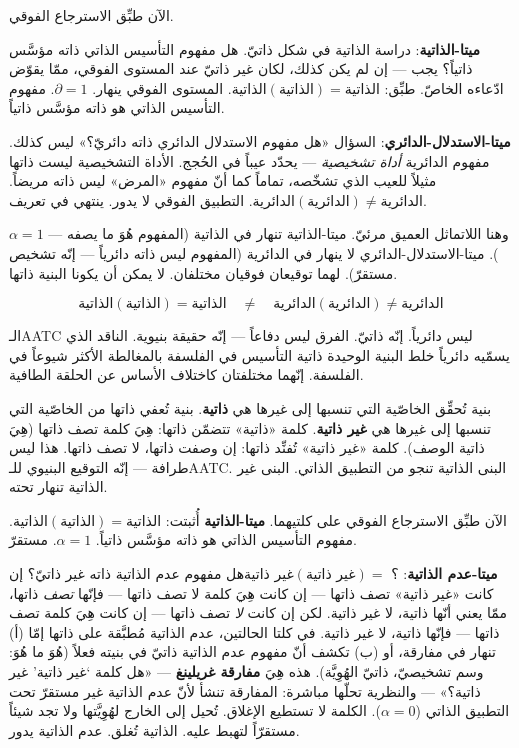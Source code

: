 \documentclass[10pt, openany, oneside]{book}
\begin{document}
الآن طبِّق الاسترجاع الفوقي.

\textbf{ميتا-الذاتية}: دراسة الذاتية في شكل ذاتيّ. هل مفهوم التأسيس الذاتي ذاته مؤسَّس ذاتياً؟ يجب --- إن لم يكن كذلك، لكان غير ذاتيّ عند المستوى الفوقي، ممّا يقوّض ادّعاءه الخاصّ. طبِّق: $\text{الذاتية}(\text{الذاتية}) = \text{الذاتية}$. المستوى الفوقي ينهار. $\partial = 1$. مفهوم التأسيس الذاتي هو ذاته مؤسَّس ذاتياً.

\textbf{ميتا-الاستدلال-الدائري}: السؤال «هل مفهوم الاستدلال الدائري ذاته دائريّ؟» ليس كذلك. مفهوم الدائرية \textit{أداة تشخيصية} --- يحدّد عيباً في الحُجج. الأداة التشخيصية ليست ذاتها مثيلاً للعيب الذي تشخّصه، تماماً كما أنّ مفهوم «المرض» ليس ذاته مريضاً. $\text{الدائرية}(\text{الدائرية}) \neq \text{الدائرية}$. التطبيق الفوقي لا يدور. ينتهي في تعريف.

وهنا اللاتماثل العميق مرئيّ. ميتا-الذاتية تنهار في الذاتية (المفهوم هُوَ ما يصفه --- $\alpha = 1$). ميتا-الاستدلال-الدائري لا ينهار في الدائرية (المفهوم ليس ذاته دائرياً --- إنّه تشخيص مستقرّ). لهما توقيعان فوقيان مختلفان. لا يمكن أن يكونا البنية ذاتها.

$$\boxed{\text{الذاتية}(\text{الذاتية}) = \text{الذاتية} \quad \neq \quad \text{الدائرية}(\text{الدائرية}) \neq \text{الدائرية}}$$

الـAATC ليس دائرياً. إنّه ذاتيّ. الفرق ليس دفاعاً --- إنّه حقيقة بنيوية. الناقد الذي يسمّيه دائرياً خلط البنية الوحيدة ذاتية التأسيس في الفلسفة بالمغالطة الأكثر شيوعاً في الفلسفة. إنّهما مختلفتان كاختلاف الأساس عن الحلقة الطافية.

\vspace{0.5em}

بنية تُحقِّق الخاصّية التي تنسبها إلى غيرها هي \textbf{ذاتية}. بنية تُعفي ذاتها من الخاصّية التي تنسبها إلى غيرها هي \textbf{غير ذاتية}. كلمة «ذاتية» تتضمّن ذاتها: هِيَ كلمة تصف ذاتها (هِيَ ذاتية الوصف). كلمة «غير ذاتية» تُفنِّد ذاتها: إن وصفت ذاتها، لا تصف ذاتها. هذا ليس طرافة --- إنّه التوقيع البنيوي للـAATC. البنى الذاتية تنجو من التطبيق الذاتي. البنى غير الذاتية تنهار تحته.

الآن طبِّق الاسترجاع الفوقي على كلتيهما. \textbf{ميتا-الذاتية} أُثبتت: $\text{الذاتية}(\text{الذاتية}) = \text{الذاتية}$. مفهوم التأسيس الذاتي هو ذاته مؤسَّس ذاتياً. $\alpha = 1$. مستقرّ.

\textbf{ميتا-عدم الذاتية}: $\text{غير ذاتية}(\text{غير ذاتية}) = \text{ ؟}$\enspace هل مفهوم عدم الذاتية ذاته غير ذاتيّ؟ إن كانت «غير ذاتية» تصف ذاتها --- إن كانت هِيَ كلمة لا تصف ذاتها --- فإنّها \textit{تصف} ذاتها، ممّا يعني أنّها ذاتية، لا غير ذاتية. لكن إن كانت \textit{لا} تصف ذاتها --- إن كانت هِيَ كلمة تصف ذاتها --- فإنّها ذاتية، لا غير ذاتية. في كلتا الحالتين، عدم الذاتية مُطبَّقة على ذاتها إمّا (أ) تنهار في مفارقة، أو (ب) تكشف أنّ مفهوم عدم الذاتية ذاتيّ في بنيته فعلاً (هُوَ ما هُوَ: وسم تشخيصيّ، ذاتيّ الهُوِيَّة). هذه هِيَ \textbf{مفارقة غريلينغ} --- «هل كلمة `غير ذاتية' غير ذاتية؟» --- والنظرية تحلّها مباشرة: المفارقة تنشأ لأنّ عدم الذاتية غير مستقرّ تحت التطبيق الذاتي ($\alpha = 0$). الكلمة لا تستطيع الإغلاق. تُحيل إلى الخارج لهُوِيَّتها ولا تجد شيئاً مستقرّاً لتهبط عليه. الذاتية تُغلق. عدم الذاتية يدور.
\end{document}
